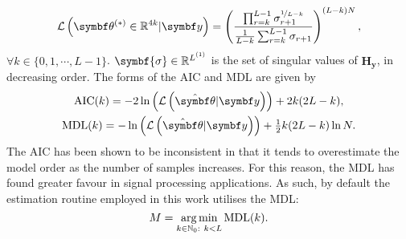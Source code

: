 \begin{equation}
    \mathcal{L}\left(\bthstar \in \mathbb{R}^{4k} | \by\right) = \left(
        \frac{
            \prod_{r=k}^{L-1} \sigma_{r+1}^{\nicefrac{1}{L-k}}
        }{
            \frac{1}{L-k} \sum_{r=k}^{L-1} \sigma_{r+1}
        }
        \right)^{(L - k) N},
        \label{eq:wax-pdf}
\end{equation}
$\forall k \in \lbrace 0, 1, \cdots, L - 1 \rbrace$. $\symbf{\sigma} \in
\mathbb{R}^{\Lone}$ is the set of singular values of $\symbf{H}_{\symbf{y}}$,
in decreasing order. The forms of the \ac{AIC} and \ac{MDL} are given by
\begin{subequations}
    \begin{gather}
        \operatorname{AIC}(k) = -2 \ln\left( \mathcal{L} \left(\hat{\bth} | \by\right) \right) + 2k(2 L - k), \\
        \operatorname{MDL}(k) = -\ln\left( \mathcal{L} \left(\hat{\bth} | \by\right) \right) + \tfrac{1}{2} k(2 L - k) \ln N. \label{eq:mdl}
    \end{gather}
\end{subequations}
The \ac{AIC} has been shown to be inconsistent in that it tends to overestimate
the model order as the number of samples increases\cite{Wax1985}. For this
reason, the \ac{MDL} has found greater favour in signal processing
applications. As such, by default the estimation routine employed in this work
utilises the \ac{MDL}:
\begin{equation}
    M = \operatorname*{arg\,min}_{k \in \mathbb{N}_0 :\ k < L} \operatorname{MDL} (k).
\end{equation}
